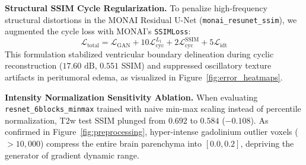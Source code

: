 \documentclass[10pt,twocolumn,letterpaper]{article}
\begin{document}
\textbf{Structural SSIM Cycle Regularization.} To penalize high-frequency structural distortions in the MONAI Residual U-Net (\texttt{monai\_resunet\_ssim}), we augmented the cycle loss with MONAI's \texttt{SSIMLoss}:
\begin{equation}
\mathcal{L}_{\text{total}} = \mathcal{L}_{\text{GAN}} + 10\mathcal{L}_{\text{cyc}}^{L_1} + 2\mathcal{L}_{\text{cyc}}^{\text{SSIM}} + 5\mathcal{L}_{\text{idt}}
\end{equation}
This formulation stabilized ventricular boundary delineation during cyclic reconstruction ($17.60\text{ dB}$, $0.551$ SSIM) and suppressed oscillatory texture artifacts in peritumoral edema, as visualized in Figure~\ref{fig:error_heatmaps}.

\textbf{Intensity Normalization Sensitivity Ablation.} When evaluating \texttt{resnet\_6blocks\_minmax} trained with naive min-max scaling instead of percentile normalization, T2w test SSIM plunged from $\mathbf{0.692}$ to $\mathbf{0.584}$ ($-0.108$). As confirmed in Figure~\ref{fig:preprocessing}, hyper-intense gadolinium outlier voxels ($>10,000$) compress the entire brain parenchyma into $[0.0, 0.2]$, depriving the generator of gradient dynamic range.

\begin{table}[tb]
\centering
\small
\caption{\textbf{Synthesis of Evaluated Techniques and Architectural Insights.}}
\label{tab:techniques}
\end{table}
\end{document}

